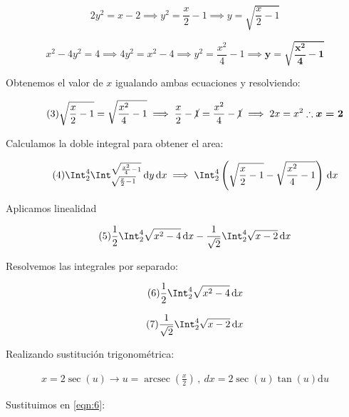\documentclass[12pt]{article}
\DeclareMathOperator{\arcsec}{arcsec}
\begin{document}
\begin{equation}\tag{1}
	2y^2 = x-2 \implies y^2 = \frac{x}{2}-1 \implies y = \sqrt{\frac{x}{2}-1}
\end{equation}

\begin{equation}\tag{2}
	x^2-4y^2=4 \implies 4y^2=x^2-4 \implies y^2=\frac{x^2}{4}-1 \implies \boldsymbol{y=\sqrt{\frac{x^2}{4}-1}} 
\end{equation}

\noindent Obtenemos el valor de $x$ igualando ambas ecuaciones y resolviendo:

\begin{equation}\tag{3}
	\sqrt{\frac{x}{2}-1}=\sqrt{\frac{x^2}{4}-1} \implies \frac{x}{2}-\cancel{1}=\frac{x^2}{4}-\cancel{1} \implies 2x = x^2 \therefore \boldsymbol{x=2}
\end{equation}

\noindent Calculamos la doble integral para obtener el area:

\begin{equation}\tag{4}
	\Int_2^4 \Int_{\sqrt{\frac{x}{2}-1}}^{\sqrt{\frac{x^2}{4}-1}} \, \mathrm{d}y \,\mathrm{d}x \implies \Int_2^4 \left(\sqrt{\frac{x}{2}-1} - \sqrt{\frac{x^2}{4}-1}\right)\, \mathrm{d}x
\end{equation}

\noindent Aplicamos linealidad

\begin{equation}\label{eqn:5}\tag{5}
	\frac{1}{2} \Int_2^4 \sqrt{x^2-4}\, \mathrm{d}x - \frac{1}{\sqrt{2}} \Int_2^4 \sqrt{x-2}\, \mathrm{d}x
\end{equation}

\noindent Resolvemos las integrales por separado:

\begin{equation}\label{eqn:6}\tag{6}
	\frac{1}{2} \Int_2^4 \sqrt{x^2-4}\, \mathrm{d}x
\end{equation}

\begin{equation}\label{eqn:7}\tag{7}
	\frac{1}{\sqrt{2}} \Int_2^4 \sqrt{x-2}\, \mathrm{d}x
\end{equation}

\noindent Realizando sustitución trigonométrica:

\begin{align*}
	x = 2 \sec(u) \to u = \arcsec(\frac{x}{2})\, , \ dx=2\sec(u)\tan(u) \mathrm{d}u
\end{align*}

\noindent Sustituimos en \eqref{eqn:6}:
\end{document}
